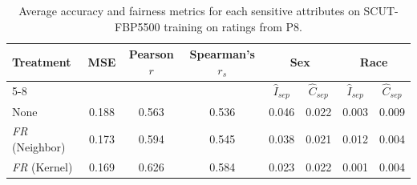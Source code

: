   
  
  
  

\begin{table}[ht]
    \setlength\extrarowheight{3pt}
  \caption{Average accuracy and fairness metrics for each sensitive attributes on SCUT-FBP5500 training on ratings from P8.}
  \label{tab:SCUT_R2}
  \begin{center}
  \begin{tabular}{l|c|c|c|c|c|c|c}
  \hline \multirow{2}{*}{Treatment} & \multirow{2}{*}{MSE} & \multirow{2}{*}{Pearson $r$} & \multirow{2}{*}{Spearman's $r_s$} & \multicolumn{2}{c|}{Sex} & \multicolumn{2}{c}{Race} \\ \cline{5-8}
  
  & & & & $\hat{I}_{sep}$ & $\hat{C}_{sep}$ & $\hat{I}_{sep}$ & $\hat{C}_{sep}$ \\ \hline
  
  {None} & 0.188 & 0.563 & 0.536 & 0.046 &  0.022 & 0.003  & 0.009 \\ 
  
  {\emph{FR} (Neighbor)} & 0.173 & 0.594 & 0.545 & 0.038 & 0.021 & 0.012 &  0.004\\
  
  {\emph{FR} (Kernel)} & 0.169 & 0.626 & 0.584 & 0.023 & 0.022 & 0.001 &  0.004\\  \hline
  \end{tabular}
  \end{center}
\end{table}


